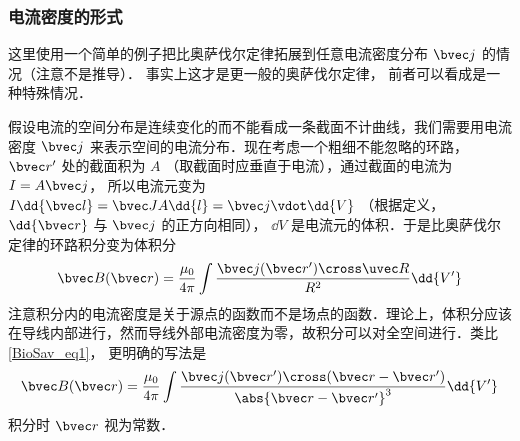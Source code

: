 \subsubsection{电流密度的形式}
这里使用一个简单的例子把比奥萨伐尔定律拓展到任意电流密度分布 $\bvec j$ 的情况（注意不是推导）． 事实上这才是更一般的奥萨伐尔定律， 前者可以看成是一种特殊情况．

假设电流的空间分布是连续变化的而不能看成一条截面不计曲线，我们需要用电流密度 $\bvec j$ 来表示空间的电流分布．现在考虑一个粗细不能忽略的环路， $\bvec r'$ 处的截面积为 $A$ （取截面时应垂直于电流），通过截面的电流为 $I = A\bvec j$， 所以电流元变为 $I \dd{\bvec l} = \bvec JA \dd{l} = \bvec j \vdot \dd{V}$ （根据定义， $\dd{\bvec r}$ 与 $\bvec j$ 的正方向相同）， $\dd{V}$ 是电流元的体积．于是比奥萨伐尔定律的环路积分变为体积分
\begin{equation}
\bvec B(\bvec r) = \frac{\mu_0}{4\pi} \int \frac{\bvec j(\bvec r') \cross \uvec R}{R^2}\dd{V'}
\end{equation}
注意积分内的电流密度是关于源点的函数而不是场点的函数．理论上，体积分应该在导线内部进行，然而导线外部电流密度为零，故积分可以对全空间进行．类比\autoref{BioSav_eq1}， 更明确的写法是
\begin{equation}
\bvec B(\bvec r) = \frac{\mu_0}{4\pi} \int \frac{\bvec j(\bvec r') \cross (\bvec r - \bvec r')}{\abs{\bvec r - \bvec r'}^3} \dd{V'}
\end{equation}
积分时 $\bvec r$ 视为常数．
